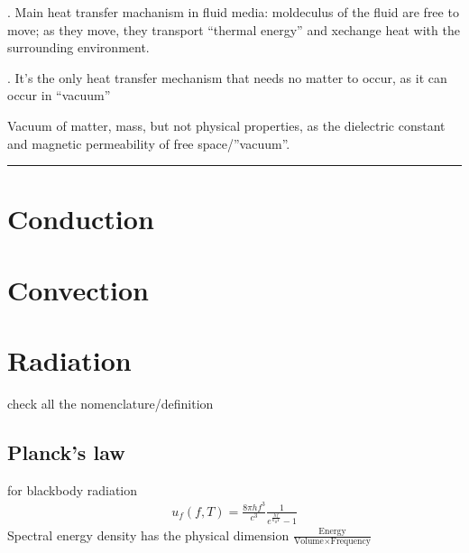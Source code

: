 \documentclass[letterpaper,10pt,english]{jupyterBook}
\begin{document}
\sphinxAtStartPar
{\hyperref[\detokenize{ch/heat-transfer-convection:classical-thermodynamics-heat-transmission-convection}]{}}. Main heat transfer machanism in fluid media: moldeculus of the fluid are free to move; as they move, they transport “thermal energy” and xechange heat with the surrounding environment.

\sphinxAtStartPar
{\hyperref[\detokenize{ch/heat-transfer-radiation:classical-thermodynamics-heat-transmission-radiation}]{}}. It’s the only heat transfer mechanism that needs no matter to occur, as it can occur in “vacuum”%
\begin{footnote}[1]\sphinxAtStartFootnote
Vacuum of matter, mass, but not physical properties, as the dielectric constant and magnetic permeability of free space/”vacuum”.
%
\end{footnote}


\bigskip\hrule\bigskip


\sphinxstepscope


\section{Conduction}
\label{\detokenize{ch/heat-transfer-conduction:conduction}}\label{\detokenize{ch/heat-transfer-conduction:classical-thermodynamics-heat-transmission-conduction}}\label{\detokenize{ch/heat-transfer-conduction::doc}}
\sphinxstepscope


\section{Convection}
\label{\detokenize{ch/heat-transfer-convection:convection}}\label{\detokenize{ch/heat-transfer-convection:classical-thermodynamics-heat-transmission-convection}}\label{\detokenize{ch/heat-transfer-convection::doc}}
\sphinxstepscope


\section{Radiation}
\label{\detokenize{ch/heat-transfer-radiation:radiation}}\label{\detokenize{ch/heat-transfer-radiation:classical-thermodynamics-heat-transmission-radiation}}\label{\detokenize{ch/heat-transfer-radiation::doc}}
\sphinxAtStartPar
check all the nomenclature/definition


\subsection{Planck’s law}
\label{\detokenize{ch/heat-transfer-radiation:planck-s-law}}
\sphinxAtStartPar
{} for black\sphinxhyphen{}body radiation
\begin{equation*}
\begin{split}u_{f}(f, T) = \frac{8 \pi h f^3}{c^3} \frac{1}{e^{\frac{hf}{k_B T}} - 1}\end{split}
\end{equation*}
\sphinxAtStartPar
Spectral energy density has the physical dimension \(\frac{\text{Energy}}{\text{Volume} \times \text{Frequency}}\)
\end{document}
